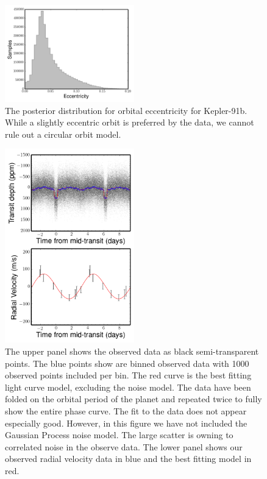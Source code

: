 \documentclass[apjl]{emulateapj}
\begin{document}
\begin{figure}
\includegraphics[width=0.50\textwidth]{ecc_hist.png}
\caption{The posterior distribution for orbital eccentricity for Kepler-91b. While a slightly eccentric orbit is preferred by the data, we cannot rule out a circular orbit model.}
\label{fig:results}
\end{figure}



\begin{figure}
\includegraphics[width=0.50\textwidth]{koi2133.png}
\caption{The upper panel shows the observed data as black semi-transparent points. The blue points show are binned observed data with 1000 observed points included per bin. The red curve is the best fitting light curve model, excluding the noise model. The data have been folded on the orbital period of the planet and repeated twice to fully show the entire phase curve. The fit to the data does not appear especially good. However, in this figure we have not included the Gaussian Process noise model. The large scatter is owning to correlated noise in the observe data. The lower panel shows our observed radial velocity data in blue and the best fitting model in red.}
\label{fig:results}
\end{figure}
\end{document}
